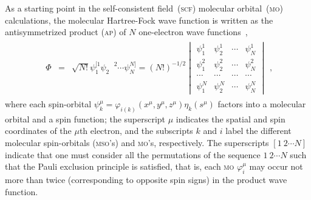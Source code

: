 As a starting point in the self-consistent field~(\textsc{scf})
molecular orbital~(\textsc{mo}) calculations, the molecular
Hartree-Fock wave function is written as the antisymmetrized product
(\textsc{ap}) of $N$ one-electron wave functions~\cite{Roothaan_HF},
%
\begin{eqnarray}
  \begin{split}
    \Phi & = & \sqrt{N!}\psi_{1}^{[1} \psi_{2}^{\phantom{[]}2} \cdots \psi_{N}^{N]} =
    (N!)^{-1/2}
    \begin{vmatrix}
      \psi_{1}^{1} & \psi_{2}^{1} & \cdots & \psi_{N}^{1} \\
      \psi_{1}^{2} & \psi_{2}^{2} & \cdots & \psi_{N}^{2} \\
      \cdots & \cdots & \cdots & \cdots \\
      \psi_{1}^{N} & \psi_{2}^{N} & \cdots & \psi_{N}^{N}
    \end{vmatrix}
  \end{split},
  \label{eq:AP}
\end{eqnarray}
%
where each spin-orbital $\psi_{k}^{\mu} = \varphi_{i(k)}(x^{\mu},
y^{\mu}, z^{\mu}) \eta_{k}(s^{\mu})$ factors into a molecular orbital
and a spin function; the superscript $\mu$ indicates the spatial and
spin coordinates of the $\mu$th electron, and the subscripts $k$ and
$i$ label the different molecular spin-orbitals (\textsc{mso}'s) and
\textsc{mo}'s, respectively. The superscripts $[1\ 2 \cdots N]$
indicate that one must consider all the permutations of the sequence
$1\ 2 \cdots N$ such that the Pauli exclusion principle is satisfied,
that is, each \textsc{mo} $\varphi_{i}^{\mu}$ may occur not more than
twice (corresponding to opposite spin signs) in the product wave
function.

